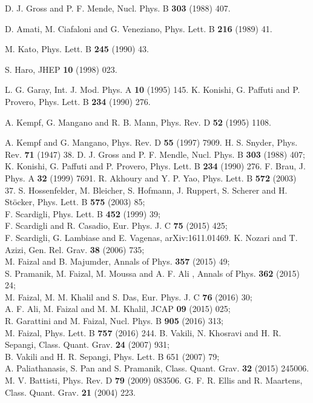 \documentclass[showpacs,amsmath,nofootinbib,amssymb,epsfig]{revtex4}
\begin{document}
\begin{thebibliography}{}
D. J. Gross and P. F. Mende, Nucl. Phys. B \textbf{303} (1988) 407.

 D. Amati, M. Ciafaloni and G. Veneziano, Phys. Lett. B \textbf{216} (1989) 41.

M. Kato, Phys. Lett. B \textbf{245} (1990) 43.

 S. Haro, JHEP \textbf{10} (1998) 023.

 L. G. Garay, Int. J. Mod. Phys. A \textbf{10} (1995) 145.
K. Konishi, G. Paffuti and P. Provero, Phys. Lett. B \textbf{234} (1990) 276.

A. Kempf, G. Mangano and R. B. Mann, Phys. Rev. D \textbf{52} (1995) 1108.

 A. Kempf and G. Mangano, Phys. Rev. D \textbf{55} (1997) 7909.
H. S. Snyder, Phys. Rev. \textbf{71} (1947) 38.
D. J. Gross and P. F. Mendle, Nucl. Phys. B {\bf 303} (1988) 407;\\ K. Konishi, G. Paffuti and P. Provero, Phys. Lett. B {\bf 234} (1990) 276.
 F. Brau, J. Phys. A \textbf{32} (1999) 7691.
 R. Akhoury and Y. P. Yao, Phys. Lett. B \textbf{572} (2003) 37.
 S. Hossenfelder, M. Bleicher, S. Hofmann, J. Ruppert, S. Scherer and H. St\"{o}cker, Phys. Lett. B
\textbf{575} (2003) 85;\\
F. Scardigli, Phys. Lett. B \textbf{452} (1999) 39;\\
F. Scardigli and R. Casadio, Eur. Phys. J. C \textbf{75} (2015) 425;\\
F. Scardigli, G. Lambiase and E. Vagenas, arXiv:1611.01469.
 K. Nozari and T. Azizi, Gen. Rel. Grav. \textbf{38} (2006) 735;\\
  M. Faizal and B. Majumder, Annals of Phys.  \textbf{357}  (2015) 49;\\
  S.  Pramanik, M. Faizal, M. Moussa and A. F. Ali , Annals of Phys. \textbf{362} (2015) 24;\\
  M. Faizal, M. M. Khalil and S.  Das, Eur. Phys. J. C \textbf{76} (2016) 30;\\
  A. F.  Ali, M.  Faizal and  M. M. Khalil, JCAP \textbf{09} (2015) 025;\\
 R.  Garattini and  M.  Faizal, Nucl. Phys. B \textbf{905} (2016) 313;\\
 M. Faizal, Phys. Lett. B \textbf{757} (2016) 244.
  B. Vakili, N. Khosravi and H. R. Sepangi, Class. Quant. Grav. \textbf{24} (2007) 931; \\B. Vakili and H. R. Sepangi, Phys. Lett. B 651 (2007) 79;\\A. Paliathanasis, S. Pan and S. Pramanik, Class. Quant. Grav. \textbf{32} (2015) 245006.
M. V. Battisti, Phys. Rev. D \textbf{79} (2009) 083506.
G. F. R. Ellis and R. Maartens, Class. Quant. Grav. {\bf 21} (2004) 223.


\end{thebibliography}
\end{document}
